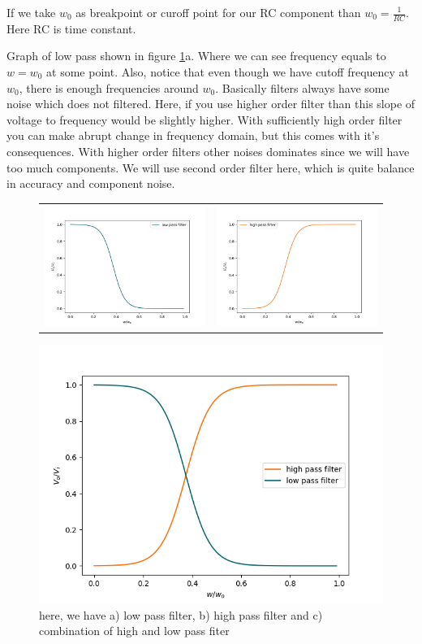 \documentclass[14pt,a4paper]{extarticle}
\begin{document}
If we take \(w_0\) as breakpoint or curoff point for our RC component than \(w_0=\frac{1}{RC}\). Here RC is time constant. 

Graph of low pass shown in figure \ref{fig:filters}a. Where we can see frequency equals to \(w=w_0\) at some point. Also, notice that even though we have cutoff frequency at \(w_0\), there is enough frequencies around \(w_0\). Basically filters always have some noise which does not filtered. Here, if you use higher order filter than this slope of voltage to frequency would be slightly higher. With sufficiently high order filter you can make abrupt change in frequency domain, but this comes with it's consequences. With higher order filters other noises dominates since we will have too much components. We will use second order filter here, which is quite balance in accuracy and component noise.


\begin{figure}[h]
\centering
\begin{tabular}{cc}
    \includegraphics[width=0.5\linewidth]{imgs/low.png}&
    \includegraphics[width=0.5\linewidth]{imgs/high.png}
\end{tabular}
\vspace{0.2cm}
\centering
\includegraphics[width=0.5\linewidth]{imgs/highlow.png}
\caption{here, we have a) low pass filter, b) high pass filter and c) combination of high and low pass fiter}
\label{fig:filters}
\end{figure}
\end{document}
